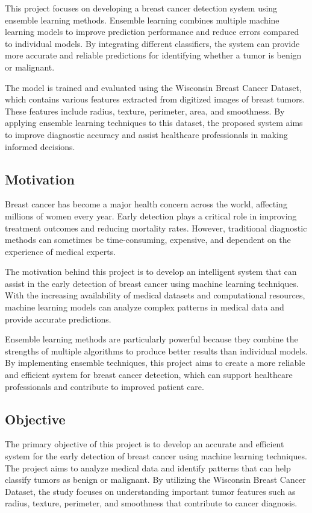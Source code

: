 \documentclass[12pt]{article}
\begin{document}
This project focuses on developing a breast cancer detection system using ensemble learning methods. Ensemble learning combines multiple machine learning models to improve prediction performance and reduce errors compared to individual models. By integrating different classifiers, the system can provide more accurate and reliable predictions for identifying whether a tumor is benign or malignant.

The model is trained and evaluated using the Wisconsin Breast Cancer Dataset, which contains various features extracted from digitized images of breast tumors. These features include radius, texture, perimeter, area, and smoothness. By applying ensemble learning techniques to this dataset, the proposed system aims to improve diagnostic accuracy and assist healthcare professionals in making informed decisions.

\subsection{Motivation}

Breast cancer has become a major health concern across the world, affecting millions of women every year. Early detection plays a critical role in improving treatment outcomes and reducing mortality rates. However, traditional diagnostic methods can sometimes be time-consuming, expensive, and dependent on the experience of medical experts.

The motivation behind this project is to develop an intelligent system that can assist in the early detection of breast cancer using machine learning techniques. With the increasing availability of medical datasets and computational resources, machine learning models can analyze complex patterns in medical data and provide accurate predictions.

Ensemble learning methods are particularly powerful because they combine the strengths of multiple algorithms to produce better results than individual models. By implementing ensemble techniques, this project aims to create a more reliable and efficient system for breast cancer detection, which can support healthcare professionals and contribute to improved patient care.

\subsection{Objective}

The primary objective of this project is to develop an accurate and efficient system for the early detection of breast cancer using machine learning techniques. The project aims to analyze medical data and identify patterns that can help classify tumors as benign or malignant. By utilizing the Wisconsin Breast Cancer Dataset, the study focuses on understanding important tumor features such as radius, texture, perimeter, and smoothness that contribute to cancer diagnosis.
\end{document}
